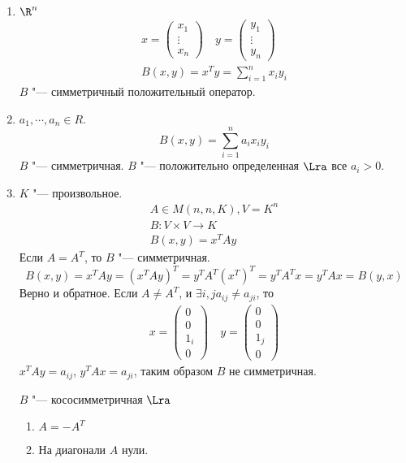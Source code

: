 \begin{exmp}
	\begin{enumerate}
	\item
		$\R^n$
		\begin{gather*}
			x = \begin{pmatrix}
				x_1 \\
				\vdots \\
				x_n
			\end{pmatrix} \quad
			y = \begin{pmatrix}
				y_1 \\
				\vdots \\
				y_n
			\end{pmatrix} \\
			B(x, y) = x^Ty = \sum_{i=1}^n x_iy_i
		\end{gather*}
		$B$ "--- симметричный положительный оператор.

	\item
		$a_1, \cdots, a_n \in R$.
		\[ B(x, y) = \sum_{i=1}^n a_ix_iy_i \]
		$B$ "--- симметричная.
		$B$ "--- положительно определенная $\Lra$ все $a_i > 0$.

	\item
		$K$ "--- произвольное.
		\begin{gather*}
			A \in M(n, n, K), V = K^n \\
			B \colon V \times V \to K \\
			B(x, y) = x^TAy
		\end{gather*}
		Если $A = A^{T}$, то $B$ "--- симметричная.
		\[ B(x, y) = x^TAy = (x^TAy)^T = y^TA^T(x^T)^T = y^TA^Tx = y^TAx = B(y, x) \]
		Верно и обратное.
		Если $A \ne A^{T}$, и $\exists i, j a_{ij} \ne a_{ji}$, то
		\begin{gather*}
			x = \begin{pmatrix}
				0 \\
				0 \\
				1_i \\
				0
			\end{pmatrix} \quad
			y = \begin{pmatrix}
					0 \\
					0 \\
					1_j \\
					0
			\end{pmatrix}
		\end{gather*}
		$x^{T}Ay = a_{ij}$, $y^TAx = a_{ji}$, таким образом $B$ не симметричная.
		
		$B$ "--- кососимметричная $\Lra$
		\begin{enumerate}
			\item $A = -A^T$
			\item На диагонали $A$ нули.
		\end{enumerate}


\end{enumerate}
\end{exmp}
